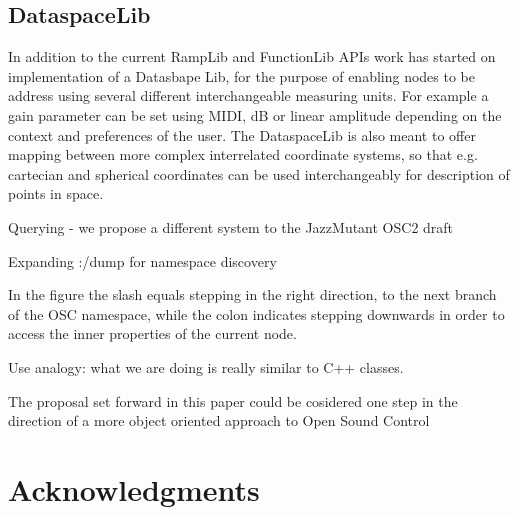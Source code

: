 \documentclass{NIME-alternate}
\begin{document}
\subsection{DataspaceLib} %
\label{sub:dataspacelib}

In addition  to the current RampLib and FunctionLib APIs work has started on implementation of a Datasbape Lib, for the purpose of enabling nodes to be address using several different interchangeable measuring units. For example a gain parameter can be set using MIDI, dB or linear amplitude depending on the context and preferences of the user. The DataspaceLib is also meant to offer mapping between more complex interrelated coordinate systems, so that e.g. cartecian and spherical coordinates can be used interchangeably for description of points in space.






Querying - we propose a different system to the JazzMutant OSC2 draft

Expanding :/dump for namespace discovery

In the figure the slash equals stepping in the right direction, to the next branch of the OSC namespace, while the colon indicates stepping downwards in order to access the inner properties of the current node.

Use analogy: what we are doing is really similar to C++ classes.

The proposal set forward in this paper could be cosidered one step in the direction of a more object oriented approach to Open Sound Control









\section{Acknowledgments} %
\label{sec:acknowledgments}
\end{document}
